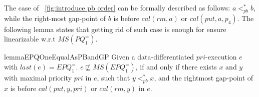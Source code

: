 The case of \figurename~\ref{fig:introduce pb order} can be formally described as follows: $a <_{\textit{pb}}^* b$, while the right-most gap-point of $b$ is before $\textit{cal}(\textit{rm},a)$ or $\textit{cal}(\textit{put},a,p_4)$. The following lemma states that getting rid of such case is enough for ensure linearizable w.r.t $\textit{MS}(\textit{PQ}_1^{=})$.

\begin{restatable}{lemma}{EPQOneEqualAsPBandGP}
\label{lemma:EPQ1Equal as pb order and gap-point}
Given a data-differentiated $\textit{pri}$-execution $e$ with $\textit{last}(e) = \textit{EPQ}_1^{=}$. $e \not\sqsubseteq \textit{MS}(\textit{EPQ}_1^{=})$, if and only if there exists $x$ and $y$ with maximal priority $\textit{pri}$ in $e$, such that $y <_{\textit{pb}}^* x$, and the rightmost gap-point of $x$ is before $\textit{cal}(\textit{put},y,\textit{pri})$ or $\textit{cal}(\textit{rm},y)$ in $e$.
\end{restatable}

